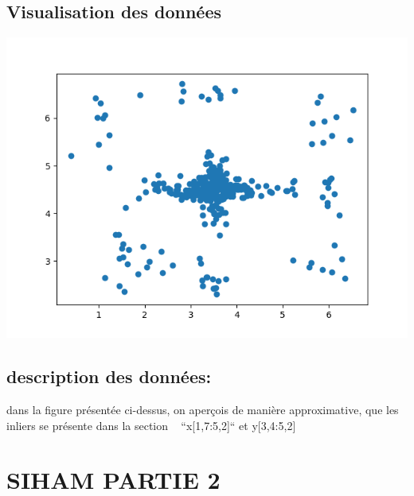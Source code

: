 \documentclass[a4paper]{article}
\makeatletter
\newenvironment{expl}{%
  \begin{list}{}{%
      \small\itshape%
      \topsep\z@%
      \listparindent0pt%
      \parsep0.75\baselineskip%
      \setlength{\leftmargin}{20mm}%
      \setlength{\rightmargin}{20mm}%
    }
  \item[]}%
  {\end{list}}
\makeatother
\begin{document}
\subsection{Visualisation des données}
\includegraphics[width=\textwidth]{Figure_1.png}

\subsection{description des données:}
\begin{expl}
    dans la figure présentée ci-dessus, on aperçois de manière approximative,  que les inliers se présente dans la section ~ ``x[1,7:5,2]`` et y[3,4:5,2]
\end{expl}

\section{SIHAM PARTIE 2}
\end{document}
